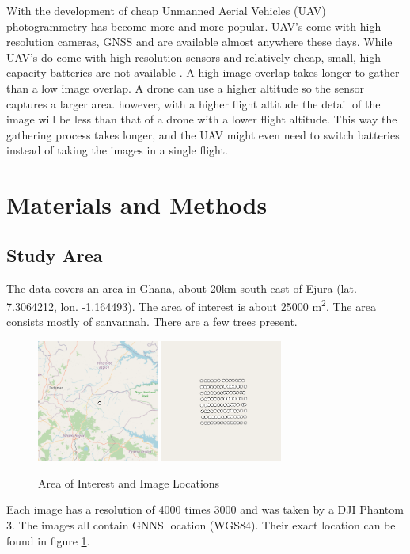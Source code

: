 \documentclass{isprs} %
\begin{document}
With the development of cheap Unmanned Aerial Vehicles (UAV) photogrammetry has become more and more popular. 
UAV's come with high resolution cameras, GNSS and are available almost anywhere these days.
While UAV's do come with high resolution sensors and relatively cheap, small, high capacity batteries are not available \citep{UAVpopularity}.
A high image overlap takes longer to gather than a low image overlap. 
A drone can use a higher altitude so the sensor captures a larger area.
however, with a higher flight altitude the detail of the image will be less than that of a drone with a lower flight altitude.
This way the gathering process takes longer, and the UAV might even need to switch batteries instead of taking the images in a single flight.


\section{Materials and Methods}

\subsection{Study Area}\label{sec:Study Area}
The data covers an area in Ghana, about 20km south east of Ejura (lat. 7.3064212, lon. -1.164493). 
The area of interest is about 25000 m\textsuperscript{2}. 
The area consists mostly of sanvannah.
There are a few trees present.
\begin{figure}[htp]
    \centering
    \includegraphics[width=4cm]{locationwide.png}
    \includegraphics[width=4cm]{locationzoom.png}
    \caption{Area of Interest and Image Locations}
    \label{fig:areaofinterest}
\end{figure}
Each image has a resolution of 4000 times 3000 and was taken by a DJI Phantom 3.
The images all contain GNNS location (WGS84). 
Their exact location can be found in figure \ref{fig:areaofinterest}.
\end{document}
